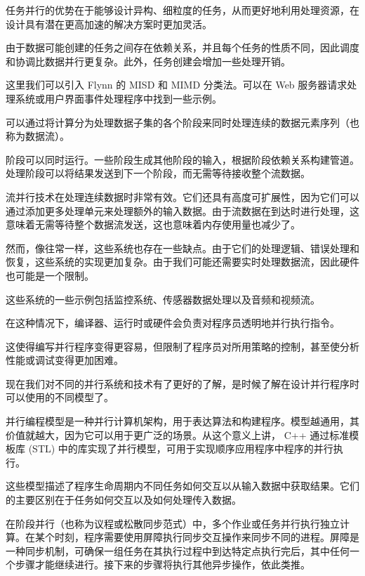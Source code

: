 任务并行的优势在于能够设计异构、细粒度的任务，从而更好地利用处理资源，在设计具有潜在更高加速的解决方案时更加灵活。

由于数据可能创建的任务之间存在依赖关系，并且每个任务的性质不同，因此调度和协调比数据并行更复杂。此外，任务创建会增加一些处理开销。

这里我们可以引入 Flynn 的 MISD 和 MIMD 分类法。可以在 Web 服务器请求处理系统或用户界面事件处理程序中找到一些示例。


可以通过将计算分为处理数据子集的各个阶段来同时处理连续的数据元素序列（也称为数据流）。

阶段可以同时运行。一些阶段生成其他阶段的输入，根据阶段依赖关系构建管道。处理阶段可以将结果发送到下一个阶段，而无需等待接收整个流数据。

流并行技术在处理连续数据时非常有效。它们还具有高度可扩展性，因为它们可以通过添加更多处理单元来处理额外的输入数据。由于流数据在到达时进行处理，这意味着无需等待整个数据流发送，这也意味着内存使用量也减少了。

然而，像往常一样，这些系统也存在一些缺点。由于它们的处理逻辑、错误处理和恢复，这些系统的实现更加复杂。由于我们可能还需要实时处理数据流，因此硬件也可能是一个限制。

这些系统的一些示例包括监控系统、传感器数据处理以及音频和视频流。


在这种情况下，编译器、运行时或硬件会负责对程序员透明地并行执行指令。

这使得编写并行程序变得更容易，但限制了程序员对所用策略的控制，甚至使分析性能或调试变得更加困难。

现在我们对不同的并行系统和技术有了更好的了解，是时候了解在设计并行程序时可以使用的不同模型了。


并行编程模型是一种并行计算机架构，用于表达算法和构建程序。模型越通用，其价值就越大，因为它可以用于更广泛的场景。从这个意义上讲， C++ 通过标准模板库 (STL) 中的库实现了并行模型，可用于实现顺序应用程序中程序的并行执行。

这些模型描述了程序生命周期内不同任务如何交互以从输入数据中获取结果。它们的主要区别在于任务如何交互以及如何处理传入数据。


在阶段并行（也称为议程或松散同步范式）中，多个作业或任务并行执行独立计算。在某个时刻，程序需要使用屏障执行同步交互操作来同步不同的进程。屏障是一种同步机制，可确保一组任务在其执行过程中到达特定点执行完后，其中任何一个步骤才能继续进行。接下来的步骤将执行其他异步操作，依此类推。

